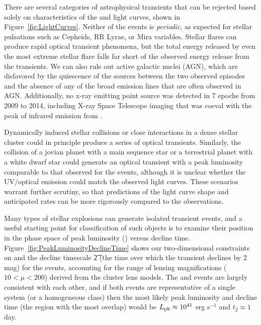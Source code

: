 There are several categories of astrophysical transients that can be
rejected based solely on characteristics of the \spockone and
\spocktwo light curves, shown in Figure~\ref{fig:LightCurves}. Neither
of the \spock events is {\it periodic}, as expected for stellar
pulsations such as Cepheids, RR Lyrae, or Mira variables. Stellar
flares can produce rapid optical transient phenomena, but the total
energy released by even the most extreme stellar
flare\cite{Karoff:2016} falls far short of the observed energy release
from the \spock transients. We can also rule out active galactic
nuclei (AGN), which are disfavored by the quiescence of the \spock
sources between the two observed episodes and the absence of any of
the broad emission lines that are often observed in AGN.
Additionally, no x-ray emitting point source was detected in 7 epochs
from 2009 to 2014, including \Chandra X-ray Space Telescope imaging
that was coeval with the peak of infrared emission from \spocktwo.

Dynamically induced stellar collisions or close interactions in a
dense stellar cluster\citep{Fregeau:2004} could in principle produce a
series of optical transients. Similarly, the collision of a jovian
planet with a main sequence star\cite{Metzger:2012,Yamazaki:2017} or a
terrestrial planet with a white dwarf star\cite{Di-Stefano:2015} could
generate an optical transient with a peak luminosity comparable to
that observed for the \spock events, although it is unclear whether
the UV/optical emission could match the observed \spock light curves.
These scenarios warrant further scrutiny, so that predictions of the
light curve shape and anticipated rates can be more rigorously
compared to the \spock observations.

Many types of stellar explosions can generate isolated transient
events, and a useful starting point for classification of such objects
is to examine their position in the phase space of peak luminosity
(\Lpk) versus decline time\cite{Kulkarni:2007}.
Figure~\ref{fig:PeakLuminosityDeclineTime} shows our two-dimensional
constraints on \Lpk and the decline timescale \t2 (the time over which
the transient declines by 2 mag) for the \spock events,
accounting for the range of lensing magnifications ($10<\mu<200$)
derived from the cluster lens models.  The \spockone and \spocktwo
events are largely consistent with each other, and if both events are
representative of a single system (or a homogeneous class) then the
most likely peak luminosity and decline time (the region with the most
overlap) would be $L_{\rm pk}\approx10^{41}$ erg s$^{-1}$ and $t_2\approx1$
day.

